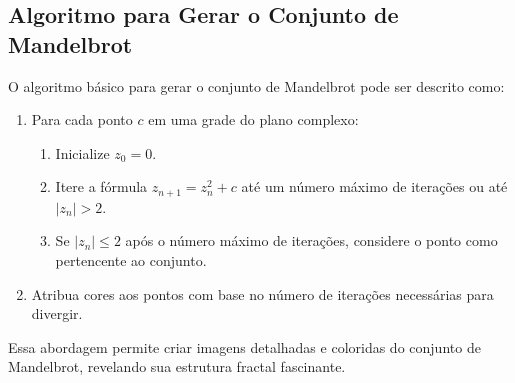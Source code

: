 \subsection{Algoritmo para Gerar o Conjunto de Mandelbrot}

O algoritmo básico para gerar o conjunto de Mandelbrot pode ser descrito como:

\begin{enumerate}
    \item Para cada ponto $c$ em uma grade do plano complexo:
    \begin{enumerate}
        \item Inicialize $z_0 = 0$.
        \item Itere a fórmula $z_{n+1} = z_n^2 + c$ até um número máximo de iterações ou até $|z_n| > 2$.
        \item Se $|z_n| \leq 2$ após o número máximo de iterações, considere o ponto como pertencente ao conjunto.
    \end{enumerate}
    \item Atribua cores aos pontos com base no número de iterações necessárias para divergir.
\end{enumerate}

Essa abordagem permite criar imagens detalhadas e coloridas do conjunto de Mandelbrot, revelando sua estrutura fractal fascinante.